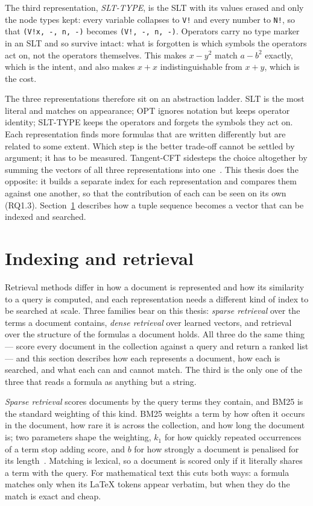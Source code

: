 The third representation, \emph{SLT-TYPE}, is the SLT with its values erased and
only the node types kept: every variable collapses to \texttt{V!} and every number
to \texttt{N!}, so that \texttt{(V!x, -, n, -)} becomes \texttt{(V!, -, n, -)}.
Operators carry no type marker in an SLT and so survive intact: what is forgotten
is which symbols the operators act on, not the operators themselves. This makes
$x - y^2$ match
$a - b^2$ exactly, which is the intent, and also makes $x + x$ indistinguishable
from $x + y$, which is the cost.

The three representations therefore sit on an abstraction ladder. SLT is the most
literal and matches on appearance; OPT ignores notation but keeps operator
identity; SLT-TYPE keeps the operators and forgets the symbols they act on. Each
representation finds more formulas that are written differently but are related to
some extent. Which step is the better trade-off cannot be settled by argument; it
has to be measured. Tangent-CFT sidesteps the choice altogether by summing the
vectors of all three representations into one~\cite{mansouri2019tangentcft}. This
thesis does the opposite: it builds a separate index for each representation and
compares them against one another, so
that the contribution of each can be seen on its own (RQ1.3).
Section~\ref{sec:bg-indexing} describes how a tuple sequence becomes a vector that
can be indexed and searched.

\section{Indexing and retrieval}\label{sec:bg-indexing}

Retrieval methods differ in how a document is represented and how its similarity
to a query is computed, and each representation needs a different kind of index to
be searched at scale. Three families bear on this thesis: \emph{sparse retrieval}
over the terms a document contains, \emph{dense retrieval} over learned vectors,
and retrieval over the structure of the formulas a document holds. All three do
the same thing --- score every document in the collection against a query and
return a ranked list --- and this section describes how each represents a
document, how each is searched, and what each can and cannot match. The third is
the only one of the three that reads a formula as anything but a string.

\emph{Sparse retrieval} scores documents by the query terms they contain, and
BM25 is the standard weighting of this kind. BM25 weights a term by how often it
occurs in the document, how rare it is across the collection, and how long the
document is; two parameters shape the weighting, $k_1$ for how quickly repeated
occurrences of a term stop adding score, and $b$ for how strongly a document is
penalised for its length~\cite{robertson2009bm25}. Matching is lexical, so a
document is scored only if it literally shares a term with the query. For
mathematical text this cuts both ways: a formula matches only when its \LaTeX{}
tokens appear verbatim, but when they do the match is exact and cheap.

